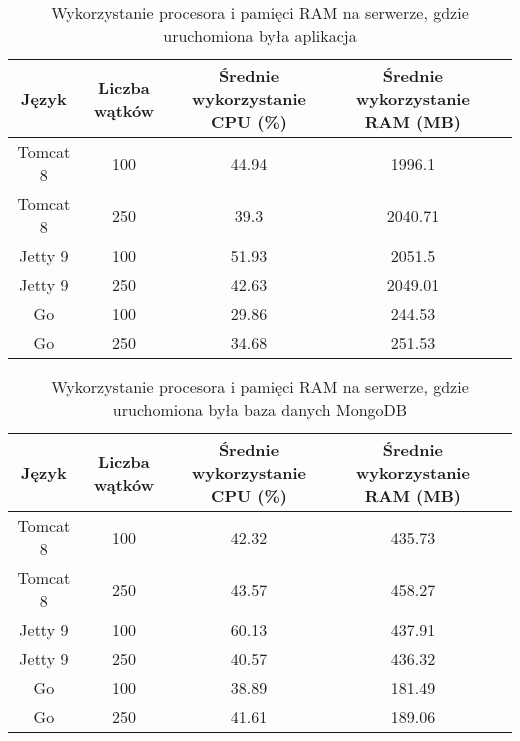 \begin{table}[!htb]
\centering
\caption{Wykorzystanie procesora i pamięci RAM na serwerze, gdzie uruchomiona była aplikacja}
\label{tab:app-full-key}
\begin{tabular}{@{}ccccl@{}}
\toprule
\textbf{Język} & \textbf{Liczba wątków} & \multicolumn{1}{p{3cm}}{\textbf{Średnie wykorzystanie CPU (\%)}} & \multicolumn{1}{p{3cm}}{\textbf{Średnie wykorzystanie RAM (MB)}} &  \\ \midrule
Tomcat 8       & 100                    & 44.94                             & 1996.1                          &  \\
Tomcat 8       & 250                    & 39.3                             & 2040.71                          &  \\
Jetty 9       & 100                    & 51.93                             & 2051.5                          &  \\
Jetty 9       & 250                    & 42.63                             & 2049.01                          &  \\
Go       & 100                    & 29.86                             & 244.53                          &  \\
Go       & 250                    & 34.68                             & 251.53                          &  \\
\bottomrule
\end{tabular}
\end{table}


\begin{table}[!htb]
\centering
\caption{Wykorzystanie procesora i pamięci RAM na serwerze, gdzie uruchomiona była baza danych MongoDB}
\label{tab:mongo-full-key}
\begin{tabular}{@{}ccccl@{}}
\toprule
\textbf{Język} & \textbf{Liczba wątków} & \multicolumn{1}{p{3cm}}{\textbf{Średnie wykorzystanie CPU (\%)}} & \multicolumn{1}{p{3cm}}{\textbf{Średnie wykorzystanie RAM (MB)}} &  \\ \midrule
Tomcat 8       & 100                    & 42.32                             & 435.73                          &  \\
Tomcat 8       & 250                    & 43.57                             & 458.27                          &  \\
Jetty 9       & 100                    & 60.13                             & 437.91                          &  \\
Jetty 9       & 250                    & 40.57                             & 436.32                          &  \\
Go       & 100                    & 38.89                             & 181.49                          &  \\
Go       & 250                    & 41.61                             & 189.06                          &  \\
\bottomrule
\end{tabular}
\end{table}

